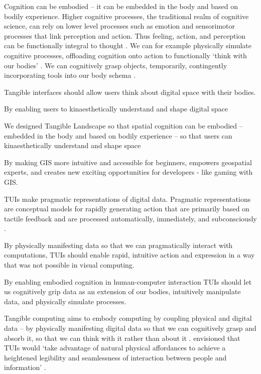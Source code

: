 

Cognition can be embodied -- it can be embedded in the body and based on bodily experience. 
Higher cognitive processes, the traditional realm of cognitive science, 
can rely on lower level processes such as emotion and sensorimotor processes that link perception and action. 
Thus feeling, action, and perception can be functionally integral to thought \cite{Hardy-Vallee2008}. 
We can for example physically simulate cognitive processes, offloading cognition onto action to functionally `think with our bodies' \cite{Kirsh2013}. 
We can cognitively grasp objects, temporarily, contingently incorporating tools into our body schema \cite{Kirsh2013}.

Tangible interfaces should allow users think about digital space with their bodies. 


By enabling users to kinaesthetically understand and shape digital space


We designed Tangible Landscape so that spatial cognition can be embodied -- embedded in the body and based on bodily experience -- so that users can kinaesthetically understand and shape space

By making GIS more intuitive and accessible for beginners, empowers geospatial experts, and creates new exciting opportunities for developers - like gaming with GIS. 


TUIs make pragmatic representations of digital data. 
Pragmatic representations are conceptual models for rapidly generating action
that are primarily based on tactile feedback and are processed automatically, immediately, 
and subconsciously \cite{Jeannerod1997}. 
%

By physically manifesting data so that we can pragmatically
interact with computations,  
TUIs should enable rapid, intuitive action and expression 
in a way that was not possible in visual computing. 

By enabling embodied cognition in human-computer interaction 
TUIs should let us cognitively grip data as an extension of our bodies, 
intuitively manipulate data, and physically simulate processes. 

Tangible computing aims to embody computing 
by coupling physical and digital data \cite{Dourish2001} -- 
by physically manifesting digital data so that we can cognitively grasp and absorb it,
so that we can think with it rather than about it \cite{Kirsh2013}. 
\cite{Ishii1997} envisioned that TUIs would  `take advantage of natural physical affordances to achieve a heightened legibility and seamlessness of interaction between people and information' \cite{Ishii1997}. 



